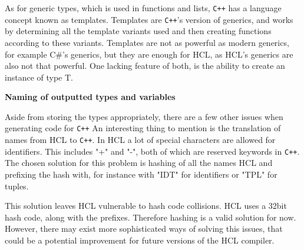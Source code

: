 As for generic types, which is used in functions and lists, \texttt{C++} has a language concept known as templates.
Templates are \texttt{C++}'s version of generics, and works by determining all the template variants used and then creating functions according to these variants.
Templates are not as powerful as modern generics, for example C\#'s generics, but they are enough for HCL, as HCL's generics are also not that powerful.
One lacking feature of both, is the ability to create an instance of type T.

\textbf{Naming of outputted types and variables}

Aside from storing the types appropriately, there are a few other issues when generating code for \texttt{C++}
An interesting thing to mention is the translation of names from HCL to \texttt{C++}.
In HCL a lot of special characters are allowed for identifiers. 
This includes "+" and "-", both of which are reserved keywords in \texttt{C++}.
The chosen solution for this problem is hashing of all the names HCL and prefixing the hash with, for instance with "IDT" for identifiers or "TPL" for tuples.

This solution leaves HCL vulnerable to hash code collisions.
HCL uses a 32bit hash code, along with the prefixes.
Therefore hashing is a valid solution for now.
However, there may exist more sophisticated ways of solving this issues, that could be a potential improvement for future versions of the HCL compiler. 
